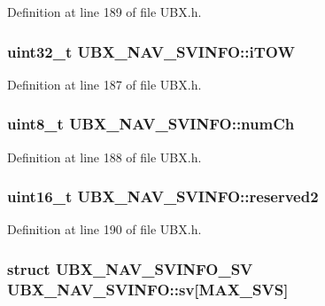 \-Definition at line 189 of file \-U\-B\-X.\-h.

\hypertarget{struct_u_b_x___n_a_v___s_v_i_n_f_o_af3c4fbdc3e4b6fe40fae556f1de555bb}{
\subsubsection[{i\-T\-O\-W}]{\setlength{\rightskip}{0pt plus 5cm}uint32\-\_\-t {\bf \-U\-B\-X\-\_\-\-N\-A\-V\-\_\-\-S\-V\-I\-N\-F\-O\-::i\-T\-O\-W}}}\label{struct_u_b_x___n_a_v___s_v_i_n_f_o_af3c4fbdc3e4b6fe40fae556f1de555bb}


\-Definition at line 187 of file \-U\-B\-X.\-h.

\hypertarget{struct_u_b_x___n_a_v___s_v_i_n_f_o_a0c11d355a8dcd6cf6687ce19ae052a52}{
\subsubsection[{num\-Ch}]{\setlength{\rightskip}{0pt plus 5cm}uint8\-\_\-t {\bf \-U\-B\-X\-\_\-\-N\-A\-V\-\_\-\-S\-V\-I\-N\-F\-O\-::num\-Ch}}}\label{struct_u_b_x___n_a_v___s_v_i_n_f_o_a0c11d355a8dcd6cf6687ce19ae052a52}


\-Definition at line 188 of file \-U\-B\-X.\-h.

\hypertarget{struct_u_b_x___n_a_v___s_v_i_n_f_o_a2c5c4d3b1882220da507ddacbe43159b}{
\subsubsection[{reserved2}]{\setlength{\rightskip}{0pt plus 5cm}uint16\-\_\-t {\bf \-U\-B\-X\-\_\-\-N\-A\-V\-\_\-\-S\-V\-I\-N\-F\-O\-::reserved2}}}\label{struct_u_b_x___n_a_v___s_v_i_n_f_o_a2c5c4d3b1882220da507ddacbe43159b}


\-Definition at line 190 of file \-U\-B\-X.\-h.

\hypertarget{struct_u_b_x___n_a_v___s_v_i_n_f_o_ae22f11e4be4f99b2627ff494e335a313}{
\subsubsection[{sv}]{\setlength{\rightskip}{0pt plus 5cm}struct {\bf \-U\-B\-X\-\_\-\-N\-A\-V\-\_\-\-S\-V\-I\-N\-F\-O\-\_\-\-S\-V} {\bf \-U\-B\-X\-\_\-\-N\-A\-V\-\_\-\-S\-V\-I\-N\-F\-O\-::sv}\mbox{[}\-M\-A\-X\-\_\-\-S\-V\-S\mbox{]}}}\label{struct_u_b_x___n_a_v___s_v_i_n_f_o_ae22f11e4be4f99b2627ff494e335a313}


